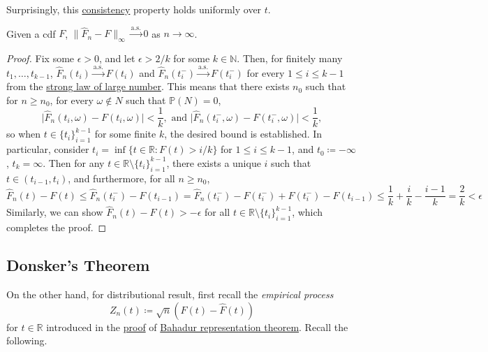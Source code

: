 Surprisingly, this \hyperref[def:consistent]{consistency} property holds uniformly over \(t\).

\begin{theorem}\label{thm:Glivenko-Cantelli}
	Given a cdf \(F\), \(\lVert \hat{F} _n - F \rVert _\infty \overset{\text{a.s.} }{\to} 0\) as \(n \to \infty \).
\end{theorem}
\begin{proof}
	Fix some \(\epsilon > 0\), and let \(\epsilon > 2 / k\) for some \(k \in \mathbb{N} \). Then, for finitely many \(t_1, \dots , t_{k-1}\), \(\hat{F} _n (t_i) \overset{\text{a.s.} }{\to } F(t_i)\) and \(\hat{F} _n(t_i^-) \overset{\text{a.s.} }{\to} F(t_i^-)\) for every \(1 \leq i \leq k-1\) from the \hyperref[thm:SLLN]{strong law of large number}. This means that there exists \(n_0\) such that for \(n \geq n_0\), for every \(\omega \notin N\) such that \(\mathbb{P} (N) = 0\),
	\[
		\vert \hat{F} _n(t_i, \omega ) - F(t_i, \omega ) \vert < \frac{1}{k} ,\text{ and }
		\vert \hat{F} _n(t_i^-, \omega ) - F(t_i^-, \omega ) \vert < \frac{1}{k},
	\]
	so when \(t \in \{ t_i \} _{i=1}^{k-1}\) for some finite \(k\), the desired bound is established. In particular, consider \(t_i = \inf \{ t \in \mathbb{R} \colon F(t) > i / k \}\) for \(1 \leq i \leq k-1\), and \(t_0 \coloneqq -\infty \), \(t_k = \infty \). Then for any \(t \in \mathbb{R} \setminus \{ t_i \}_{i=1}^{k-1} \), there exists a unique \(i\) such that \(t \in (t_{i-1}, t_i)\), and furthermore, for all \(n \geq n_0\),
	\[
		\hat{F} _n(t) - F(t)
		\leq \hat{F} _n(t_i^-) - F(t_{i-1})
		= \hat{F} _n(t_i^-) - F(t_i^-) + F(t_i^-) - F(t_{i-1})
		\leq \frac{1}{k} + \frac{i}{k} - \frac{i-1}{k}
		= \frac{2}{k}
		< \epsilon
	\]
	Similarly, we can show \(\hat{F} _n(t) - F(t) > - \epsilon \) for all \(t \in \mathbb{R} \setminus \{ t_i \}_{i=1}^{k-1} \), which completes the proof.
\end{proof}

\subsection{Donsker's Theorem}
On the other hand, for distributional result, first recall the \emph{empirical process}
\[
	Z_n(t) \coloneqq \sqrt{n} (F(t) - \hat{F} (t))
\]
for \(t \in \mathbb{R} \) introduced in the \hyperref[pf:Bahadur-representation]{proof} of \hyperref[thm:Bahadur-representation]{Bahadur representation theorem}. Recall the following.

